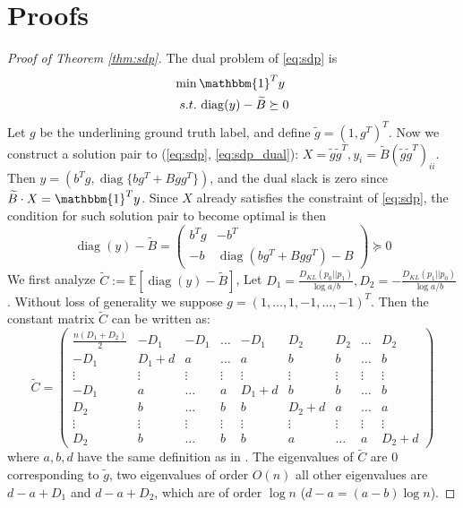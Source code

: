 \documentclass[conference]{IEEEtran}
\DeclareMathOperator{\diag}{diag}
\begin{document}
\section{Proofs}
\begin{proof}[Proof of Theorem \ref{thm:sdp}]
The dual problem of \eqref{eq:sdp} is
\begin{align}
\min\, & \mathbbm{1}^T y \notag \\
s.t.\,& \diag(y) - \widetilde{B} \succeq 0
\label{eq:sdp_dual}
\end{align}
Let $g$ be the underlining ground truth label, and
define $\tilde{g} = (1,g^T)^T$.
Now we construct a solution pair to (\ref{eq:sdp}, \ref{eq:sdp_dual}): $X=\tilde{g}\tilde{g}^T, y_i = \tilde{B}(\tilde{g}\tilde{g}^T)_{ii}$.
Then $y = (b^T g, \diag\{bg^T+Bgg^T\})$, and the dual slack is zero since $\widetilde{B} \cdot X = \mathbbm{1}^T y $.
Since $X$ already satisfies the constraint of \eqref{eq:sdp}, the condition for such solution pair to become optimal is then
$$
\diag(y) - \tilde{B}  = \begin{pmatrix} b^T g & -b^T \\ -b & \diag(bg^T + Bgg^T) - B \end{pmatrix}
\succeq 0
$$
We first analyze $\widetilde{C}:=\mathbb{E}[\diag(y) - \widetilde{B}]$, Let $D_1 = \frac{D_{KL}(p_0||p_1)}{\log a/b},
D_2 = -\frac{D_{KL}(p_1||p_0)}{\log a/b}$. Without loss of generality we suppose $g=(1, \dots, 1, -1, \dots, -1)^T$.
Then the constant matrix $\widetilde{C}$ can be written as:
{\scriptsize
\begin{equation*}
\tilde{C}=\begin{pmatrix}
\frac{n(D_1 + D_2)}{2} & -D_1 & -D_1& \dots & -D_1 & D_2 & D_2 & \dots & D_2 \\
-D_1 & D_1 + d & a & \dots & a & b & b & \dots & b \\
\vdots & \vdots & \vdots & \vdots & \vdots & \vdots & \vdots & \vdots & \vdots \\
-D_1 & a & \dots & a & D_1 + d & b & b & \dots & b \\
D_2 & b & \dots & b & b & D_2 + d  & a & \dots & a \\
\vdots & \vdots & \vdots & \vdots & \vdots &\vdots & \vdots & \vdots & \vdots \\
D_2 & b & \dots & b & b & a & \dots & a & D_2 + d 
\end{pmatrix}
\end{equation*}
}
where $a,b,d$ have the same definition as in \cite{abbe}.
The eigenvalues of $\tilde{C}$ are $0$ corresponding to $\tilde{g}$, two eigenvalues of order $O(n)$
all other eigenvalues are $d-a+D_1$ and $d-a+D_2$, which are of order $\log n$ ($d-a=(a-b)\log n$).


\end{proof}
\end{document}

